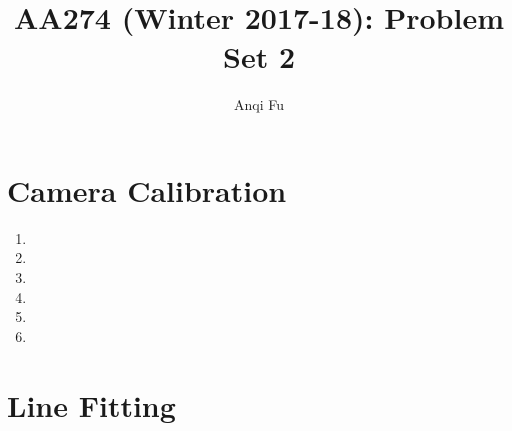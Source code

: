 \documentclass[12pt]{article}
\title{\Large{AA274 (Winter 2017-18): Problem Set 2}}
\author{Anqi Fu}
\begin{document}
	\maketitle

\section{Camera Calibration}
\begin{enumerate}
	\item 
	\item 
	\item 
	\item 
	\item 
	\item 
\end{enumerate}

\section{Line Fitting}
\end{document}
